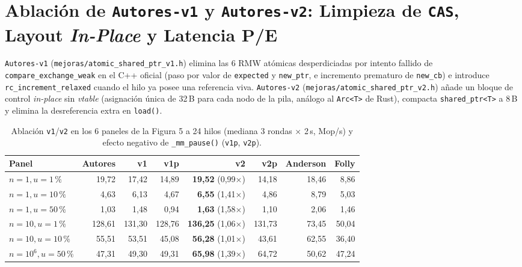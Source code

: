 \documentclass[11pt,a4paper]{article}
\begin{document}
\section{Ablación de \texttt{Autores-v1} y \texttt{Autores-v2}: Limpieza de \texttt{CAS}, Layout \emph{In-Place} y Latencia P/E}

\texttt{Autores-v1} (\texttt{mejoras/atomic\_shared\_ptr\_v1.h}) elimina las 6 RMW atómicas desperdiciadas por intento fallido de \texttt{compare\_exchange\_weak} en el C++ oficial (paso por valor de \texttt{expected} y \texttt{new\_ptr}, e incremento prematuro de \texttt{new\_cb}) e introduce \texttt{rc\_increment\_relaxed} cuando el hilo ya posee una referencia viva. \texttt{Autores-v2} (\texttt{mejoras/atomic\_shared\_ptr\_v2.h}) añade un bloque de control \emph{in-place} sin \emph{vtable} (asignación única de 32\,B para cada nodo de la pila, análogo al \texttt{Arc<T>} de Rust), compacta \texttt{shared\_ptr<T>} a 8\,B y elimina la desreferencia extra en \texttt{load()}.

\begin{table}[H]
\centering
\caption{Ablación \texttt{v1}/\texttt{v2} en los 6 paneles de la Figura 5 a 24 hilos (mediana 3 rondas $\times$ 2\,s, Mop/s) y efecto negativo de \texttt{\_mm\_pause()} (\texttt{v1p}, \texttt{v2p}).}
\label{tab:v1v2_24h}
\footnotesize
\begin{tabular}{@{}l r r r r r r r@{}}
\toprule
\textbf{Panel} & \textbf{Autores} & \textbf{v1} & \textbf{v1p} & \textbf{v2} & \textbf{v2p} & \textbf{Anderson} & \textbf{Folly} \\
\midrule
$n=1, u=1\,\%$ & 19{,}72 & 17{,}42 & 14{,}89 & \textbf{19{,}52} (0{,}99$\times$) & 14{,}18 & 18{,}46 & 8{,}86 \\
$n=1, u=10\,\%$ & 4{,}63 & 6{,}13 & 4{,}67 & \textbf{6{,}55} (1{,}41$\times$) & 4{,}86 & 8{,}79 & 5{,}03 \\
$n=1, u=50\,\%$ & 1{,}03 & 1{,}48 & 0{,}94 & \textbf{1{,}63} (1{,}58$\times$) & 1{,}10 & 2{,}06 & 1{,}46 \\
$n=10, u=1\,\%$ & 128{,}61 & 131{,}30 & 128{,}76 & \textbf{136{,}25} (1{,}06$\times$) & 131{,}73 & 73{,}45 & 50{,}04 \\
$n=10, u=10\,\%$ & 55{,}51 & 53{,}51 & 45{,}08 & \textbf{56{,}28} (1{,}01$\times$) & 43{,}61 & 62{,}55 & 36{,}40 \\
$n=10^6, u=50\,\%$ & 47{,}31 & 49{,}30 & 49{,}31 & \textbf{65{,}98} (1{,}39$\times$) & 64{,}72 & 50{,}62 & 47{,}24 \\
\bottomrule
\end{tabular}
\end{table}
\end{document}
